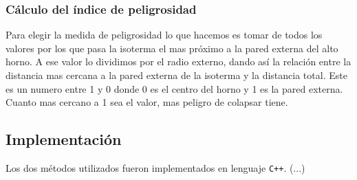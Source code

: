         \subsubsection{Cálculo del índice de peligrosidad}

            Para elegir la medida de peligrosidad lo que hacemos es tomar de todos los valores por los que pasa la isoterma el mas próximo a la pared externa del alto horno. A ese valor lo dividimos por el radio externo, dando así la relación entre la distancia mas cercana a la pared externa de la isoterma y la distancia total.
            Este es un numero entre 1 y 0 donde 0 es el centro del horno y 1 es la pared externa. Cuanto mas cercano a 1 sea el valor, mas peligro de colapsar tiene. 

    \subsection{Implementación}

        Los dos métodos utilizados fueron implementados en lenguaje \texttt{C++}. (...)